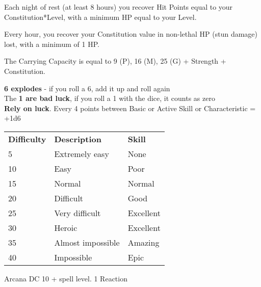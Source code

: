 \documentclass[landscape,10pt,a4paper]{article}
\begin{document}
\begin{multicols}{3}
\begin{dmbox}[title=Rest 8 hours - page \pageref{recuperarepf}]
Each night of rest (at least 8 hours) you recover Hit Points equal to your Constitution*Level, with a minimum HP equal to your Level.
\end{dmbox}


\begin{dmbox}[title=Non-lethal damage - page \pageref{nonlethalhitpointrecovery}]
Every hour, you recover your Constitution value in non-lethal HP (stun damage) lost, with a minimum of 1 HP.
\end{dmbox}



\begin{dmbox}[title=Carrying Capacity - page \pageref{carryingcapacity}]
The Carrying Capacity is equal to 9 (P), 16 (M), 25 (G) + Strength + Constitution.
\end{dmbox}


\begin{dmbox}[title=Golden Rules - page \pageref{goldenrules}]
{\textbf{6 explodes}} - if you roll a 6, add it up and roll again\\
The \textbf{1 are bad luck}, if you roll a 1 with the dice, it counts as zero\\
\textbf{Rely on luck}. Every 4 points between Basic or Active Skill or Characteristic = +1d6
\end{dmbox}



\begin{dmbox}[title=Difficulty and Skill - page \pageref{basedifficolta}]
\begin{tabular}{lll}
\textbf{Difficulty} & \textbf{Description} & \textbf{Skill} \\
5 & Extremely easy & None\\
10 & Easy & Poor\\
15 & Normal & Normal\\
20 & Difficult & Good\\
25 & Very difficult & Excellent\\
30 & Heroic & Excellent\\
35 & Almost impossible & Amazing\\
40 & Impossible & Epic\\
\end{tabular}
\end{dmbox}


\begin{dmbox}[title=Recognising a spell - page \pageref{recognising spell}]
Arcana DC 10 + spell level. 1 Reaction
\end{dmbox}



\end{multicols}
\end{document}
